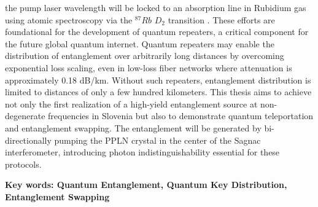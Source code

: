 \documentclass{article}
\theoremstyle{mytheoremstyle}
\theoremstyle{mytheoremstyle}
\theoremstyle{myproblemstyle}
\begin{document}
the pump laser wavelength will be locked to an absorption line in Rubidium gas using atomic spectroscopy via the $^{87}Rb$ $D_2$ transition \cite{metger2017sas}.
These efforts are foundational for the development of quantum repeaters, a critical component for the future global quantum internet.
Quantum repeaters may enable the distribution of entanglement over arbitrarily long distances by overcoming exponential loss scaling,
even in low-loss fiber networks where attenuation is approximately 0.18 dB/km. Without such repeaters,
entanglement distribution is limited to distances of only a few hundred kilometers.
This thesis aims to achieve not only the first realization of a high-yield entanglement source at non-degenerate frequencies 
in Slovenia but also to demonstrate quantum teleportation and entanglement swapping.
The entanglement will be generated by bi-directionally pumping the PPLN crystal in the center of the Sagnac interferometer,
introducing photon indistinguishability essential for these protocols.

\textbf{Key words: Quantum Entanglement, Quantum Key Distribution, Entanglement Swapping}
\end{document}
